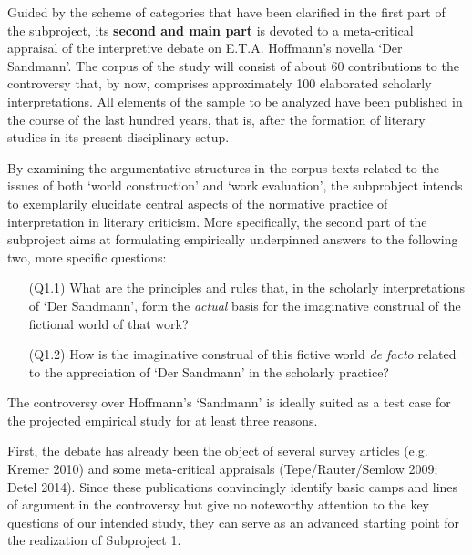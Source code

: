 Guided by the scheme of categories that have been clarified in the first part of the subproject, its \textbf{second and main part} is devoted to a meta-critical appraisal of the interpretive debate on E.T.A. Hoffmann's novella `Der Sandmann'. The corpus of the study will consist of about 60 contributions to the controversy that, by now, comprises approximately 100 elaborated scholarly interpretations. All elements of the sample to be analyzed have been published in the course of the last hundred years, that is, after the formation of literary studies in its present disciplinary setup. 

By examining the argumentative structures in the corpus-texts related to the issues of both `world construction' and `work evaluation', the subprobject intends to exemplarily elucidate central aspects of the normative practice of interpretation in literary criticism. More specifically, the second part of the subproject aims at formulating empirically underpinned answers to the following two, more specific questions:

\vspace{-.1cm}
\begin{itemize}[leftmargin=2cm]
\item[(Q1.1)] What are the principles and rules that, in the scholarly interpretations of `Der Sandmann', form the \emph{actual} basis for the imaginative construal of the fictional world of that work?
\end{itemize}
\vspace{-.1cm}

\vspace{-.1cm}
\begin{itemize}[leftmargin=2cm]
\item[(Q1.2)] How is the imaginative construal of this fictive world \emph{de facto} related to the appreciation of `Der Sandmann' in the scholarly practice?
\end{itemize}
\vspace{-.1cm}

\noindent The controversy over Hoffmann's `Sandmann' is ideally suited as a test case for the projected empirical study for at least three reasons. 

First, the debate has already been the object of several survey articles (e.g. Kremer 2010) and some meta-critical appraisals (Tepe/Rauter/Semlow 2009; Detel 2014). Since these publications convincingly identify basic camps and lines of argument in the controversy but give no noteworthy attention to the key questions of our intended study, they can serve as an advanced starting point for the realization of Subproject 1. 

